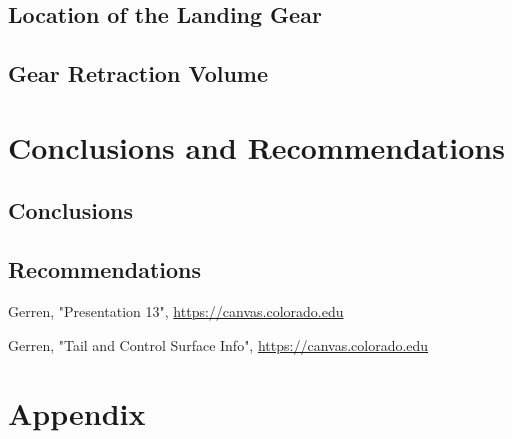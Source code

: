 \documentclass[conf]{new-aiaa}
\begin{document}
\subsection{Location of the Landing Gear}


\subsection{Gear Retraction Volume}

\section{Conclusions and Recommendations}
\subsection{Conclusions}

\subsection{Recommendations}

\begin{thebibliography}{99}


 Gerren, "Presentation 13", \url{https://canvas.colorado.edu}

 Gerren, "Tail and Control Surface Info", \url{https://canvas.colorado.edu}

\end{thebibliography}

\section{Appendix}
\end{document}
